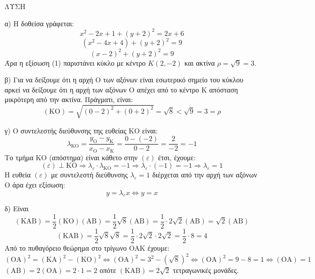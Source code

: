 ΛΥΣΗ

α) Η δοθείσα γράφεται:
\[
x^2 - 2x + 1 + (y+2)^2 = 2x + 6
\]
\[
(x^2 - 4x + 4) + (y+2)^2 = 9
\]
\[
(x-2)^2 + (y+2)^2 = 9
\]
Άρα η εξίσωση (1) παριστάνει κύκλο με κέντρο $K(2,-2)$ και ακτίνα $\rho = \sqrt{9} = 3$.

β) Για να δείξουμε ότι η αρχή O των αξόνων είναι εσωτερικό σημείο του κύκλου αρκεί να δείξουμε ότι η αρχή των αξόνων O απέχει από το κέντρο K απόσταση μικρότερη από την ακτίνα.
Πράγματι, είναι:
\[
(\text{KO}) = \sqrt{(0-2)^2 + (0+2)^2} = \sqrt{8} < \sqrt{9} = 3 = \rho
\]

γ) Ο συντελεστής διεύθυνσης της ευθείας KO είναι:
\[
\lambda_{\text{KO}} = \frac{y_{\text{O}} - y_{\text{K}}}{x_{\text{O}} - x_{\text{K}}} = \frac{0-(-2)}{0-2} = \frac{2}{-2} = -1
\]
Το τμήμα KO (απόστημα) είναι κάθετο στην $(\varepsilon)$ έτσι, έχουμε:
\[
(\varepsilon) \perp \text{KO} \Rightarrow \lambda_\varepsilon \cdot \lambda_{\text{KO}} = -1 \Rightarrow \lambda_\varepsilon \cdot (-1) = -1 \Rightarrow \lambda_\varepsilon = 1
\]
Η ευθεία $(\varepsilon)$ με συντελεστή διεύθυνσης $\lambda_\varepsilon = 1$ διέρχεται από την αρχή των αξόνων O άρα έχει εξίσωση:
\[
y = \lambda_\varepsilon x \Leftrightarrow y = x
\]

δ) Είναι
\[
(\text{KAB}) = \frac{1}{2} (\text{KO})(\text{AB}) = \frac{1}{2} \sqrt{8} (\text{AB}) = \frac{1}{2} \cdot 2\sqrt{2} (\text{AB}) = \sqrt{2} (\text{AB})
\]
\[
(\text{KAB}) = \frac{1}{2} \sqrt{8} \sqrt{8} = \frac{1}{2} \cdot 2\sqrt{2} \cdot 2\sqrt{2} = \frac{1}{2} \cdot 8 = 4
\]
Από το πυθαγόρειο θεώρημα στο τρίγωνο OAK έχουμε:
\[
(\text{OA})^2 = (\text{KA})^2 - (\text{KO})^2 \Leftrightarrow (\text{OA})^2 = 3^2 - (\sqrt{8})^2 \Leftrightarrow (\text{OA})^2 = 9-8=1 \Leftrightarrow (\text{OA})=1
\]
$(\text{AB}) = 2(\text{OA}) = 2 \cdot 1 = 2$ οπότε $(\text{KAB}) = 2\sqrt{2}$ τετραγωνικές μονάδες.

\endlysh